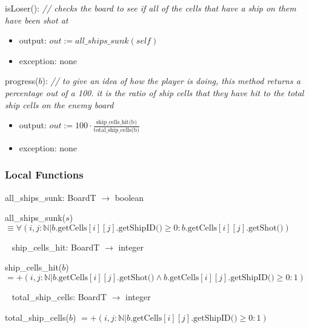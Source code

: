 \documentclass[12pt]{article}
\begin{document}
\noindent isLoser(): {\it // checks the board to see if all of the cells that have a ship on them have been shot at}
\begin{itemize}
\item output: $out := all\_ships\_sunk(self)$
\item exception: none
\end{itemize}

\noindent progress($b$): {\it // to give an idea of how the player is doing, this method returns a percentage out of a 100. it is the ratio of ship cells that they have hit to the total ship cells on the enemy board}
\begin{itemize}
\item output: $out := 100 \cdot \frac{\mbox{ship\_cells\_hit(b)}}{\mbox{total\_ship\_cells(b)}}$
\item exception: none
\end{itemize}

\subsubsection* {Local Functions}

\noindent all\_ships\_sunk: BoardT $\rightarrow$ boolean

\noindent all\_ships\_sunk($s$) $\equiv \forall (i, j : \mathbb{N} | b.\mbox{getCells}[i][j].\mbox{getShipID()}\geq 0 : b.\mbox{getCells}[i][j].\mbox{getShot()})  $

~\newline
\noindent ship\_cells\_hit: BoardT $\rightarrow$ integer

\noindent ship\_cells\_hit($b$) $ = + (i, j : \mathbb{N} | b.\mbox{getCells}[i][j].\mbox{getShot()} \wedge b.\mbox{getCells}[i][j].\mbox{getShipID()}\geq 0 : 1)  $

~\newline
\noindent total\_ship\_cells: BoardT $\rightarrow$ integer

\noindent total\_ship\_cells($b$) $ = + (i, j : \mathbb{N} | b.\mbox{getCells}[i][j].\mbox{getShipID()}\geq 0 : 1)  $

\end{document}
